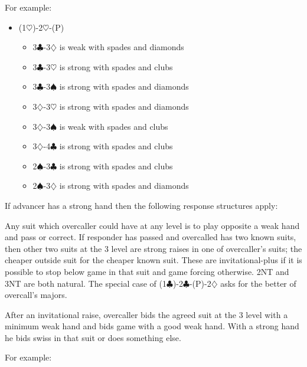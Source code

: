 \documentclass[a4paper,14pt]{extarticle}
\begin{document}
\newpage

For example:
\begin{itemize}
\item (1$\heartsuit$)-2$\heartsuit$-(P)
	\begin{itemize}
	\item 3$\clubsuit$-3$\diamondsuit$ is weak with spades and diamonds
	\item 3$\clubsuit$-3$\heartsuit$ is strong with spades and clubs
	\item 3$\clubsuit$-3$\spadesuit$ is strong with spades and diamonds
	\item 3$\diamondsuit$-3$\heartsuit$ is strong with spades and diamonds
	\item 3$\diamondsuit$-3$\spadesuit$ is weak with spades and clubs
	\item 3$\diamondsuit$-4$\clubsuit$ is strong with spades and clubs
	\item 2$\spadesuit$-3$\clubsuit$ is strong with spades and clubs
	\item 2$\spadesuit$-3$\diamondsuit$ is strong with spades and diamonds
	\end{itemize}
\end{itemize}

If advancer has a strong hand then the following response structures apply:

Any suit which overcaller could have at any level is to play opposite a weak
hand and pass or correct. If responder has passed and overcalled has two known
suits, then other two suits at the 3 level are strong raises in one of
overcaller's suits; the cheaper outside suit for the cheaper known suit. These
are invitational-plus if it is possible to stop below game in that suit and
game forcing otherwise. 2NT and 3NT are both natural. The special case of
(1$\clubsuit$)-2$\clubsuit$-(P)-2$\diamondsuit$ asks for the better of
overcall's majors.

After an invitational raise, overcaller bids the agreed suit at the 3 level
with a minimum weak hand and bids game with a good weak hand. With a strong
hand he bids swiss in that suit or does something else.

\newpage

For example:
\end{document}

